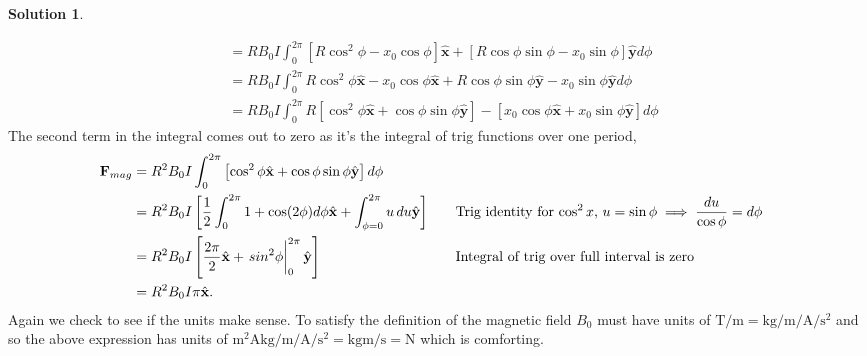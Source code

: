 \documentclass[10pt]{article}
\theoremstyle{definition}
\newtheorem{soln}{Solution}
\newcommand{\ux}{\hat{\mathbf{x}}}
\newcommand{\uy}{\hat{\mathbf{y}}}
\newcommand{\justif}[2]{&{#1}&\text{#2}}
\newcommand{\bv}[1]{\bm{\mathrm{#1}}}
\begin{document}
\begin{soln}
\begin{enumerate}[label=(\alph*)]
\begin{align*}
                         & =RB_0 I\int_{0}^{2\pi}  \left[R\cos^2\phi-x_0\cos\phi\right]\ux+\left[R\cos\phi\sin\phi-x_0\sin\phi\right]\uy d\phi      \\
                         & =RB_0 I\int_{0}^{2\pi}  R\cos^2\phi\ux-x_0\cos\phi\ux+R\cos\phi\sin\phi\uy-x_0\sin\phi\uy d\phi                          \\
                         & =RB_0 I\int_{0}^{2\pi}  R\left[\cos^2\phi\ux+\cos\phi\sin\phi\uy\right]-\left[x_0\cos\phi\ux+x_0\sin\phi\uy \right]d\phi
          \end{align*}
          The second term in the integral comes out to zero as it's the integral of trig functions over one period,
          \begin{align*}
            \bv{F}_{mag} & =R^2B_0 I\int_{0}^{2\pi}  \left[\cos^2\phi\ux+\cos\phi\sin\phi\uy\right]d\phi                                                                                                                    \\
                         & =R^2B_0 I  \left[\frac{1}{2}\int_{0}^{2\pi}1+\cos(2\phi) d\phi\ux+\int_{\phi=0}^{2\pi}u\,du\uy\right]\justif{\quad}{Trig identity for $\cos^2x$, $u=\sin\phi\implies \frac{du}{\cos\phi}=d\phi$} \\
                         & =R^2B_0 I  \left[\frac{2\pi}{2}\ux+\eval{sin^2\phi}_{0}^{2\pi}\uy\right]\justif{\quad}{Integral of trig over full interval is zero}                                                              \\
                         & =R^2B_0 I\pi\ux.
          \end{align*}
          Again we check to see if the units make sense. To satisfy the definition of the magnetic field $B_0$ must have units of
          $\unit{\tesla\per\meter}=\unit{\kilo\gram\per\meter\per\ampere\per\second\squared}$ and so the above expression has units of
          $\unit{\meter\squared\ampere\kilo\gram\per\meter\per\ampere\per\second\squared}=\unit{\kilo\gram\meter\per\second}=\unit{\newton}$ which is comforting.
  \end{enumerate}
\end{soln}
\end{document}
